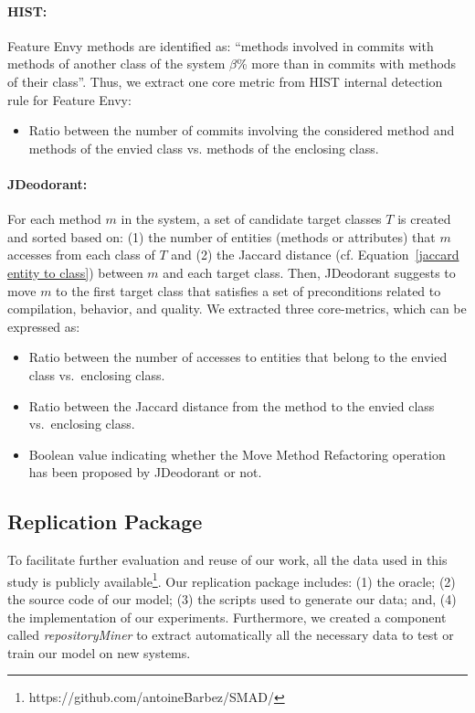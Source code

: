 \paragraph{HIST:}
Feature Envy methods are identified as: ``methods involved in commits with methods of another class of the system $\beta$\% more than in commits with methods of their class''. Thus, we extract one core metric from HIST internal detection rule for Feature Envy:
\begin{itemize}
\item Ratio between the number of commits involving the considered method and methods of the envied class vs. methods of the enclosing class. 
\end{itemize}

\paragraph{JDeodorant:}
For each method $m$ in the system, a set of candidate target classes $T$ is created and sorted based on: (1) the number of entities (methods or attributes) that $m$ accesses from each class of $T$ and (2) the Jaccard distance (cf. Equation~\ref{jaccard entity to class}) between $m$ and each target class. Then, JDeodorant suggests to move $m$ to the first target class that satisfies a set of preconditions related to compilation, behavior, and quality. We extracted three core-metrics, which can be expressed as:
\begin{itemize}
\item Ratio between the number of accesses to entities that belong to the envied class vs.\ enclosing class.
\item Ratio between the Jaccard distance from the method to the envied class vs.\ enclosing class.
\item Boolean value indicating whether the Move Method Refactoring operation has been proposed by JDeodorant or not.
\end{itemize}

\subsection{Replication Package}
To facilitate further evaluation and reuse of our work, all the data used in this study is publicly available\footnote{https://github.com/antoineBarbez/SMAD/}. Our replication package includes: (1) the oracle; (2) the source code of our model; (3) the scripts used to generate our data; and, (4) the implementation of our experiments. Furthermore, we created a component called \textit{repositoryMiner} to extract automatically all the necessary data to test or train our model on new systems.
